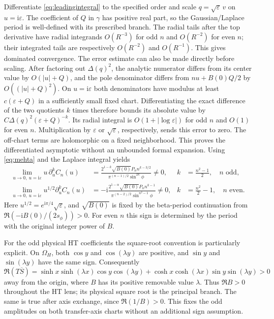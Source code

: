 \documentclass[11pt]{article}
\numberwithin{equation}{section}
\theoremstyle{definition}
\newcommand{\ii}{\mathrm i}
\newcommand{\eps}{\varepsilon}
\newcommand{\OH}{\Omega_H}
\begin{document}
Differentiate \eqref{eq:leadingintegral} to the specified order and
scale $q=\sqrt\eps\,v$ on $u=\ii\eps$. The coefficient of $Q$ in
$\gamma$ has positive real part, so the Gaussian/Laplace period is
well-defined with its prescribed branch. The radial tails after the
top derivative have radial integrands $O(R^{-3})$ for odd $n$ and
$O(R^{-2})$ for even $n$; their integrated tails are respectively
$O(R^{-2})$ and $O(R^{-1})$. This gives dominated convergence.
The error estimate can also be made directly before scaling.
After factoring out $\Delta(q)^2$, the analytic numerator differs
from its center value by $O(|u|+Q)$, and the pole denominator differs
from $nu+B(0)Q/2$ by $O((|u|+Q)^2)$. On $u=\ii\eps$ both
denominators have modulus at least $c(\eps+Q)$ in a sufficiently
small fixed chart. Differentiating the exact difference of the two
quotients $k$ times therefore bounds its absolute value by
$C\Delta(q)^2(\eps+Q)^{-k}$. Its radial integral is
$O(1+|\log\eps|)$ for odd $n$ and $O(1)$ for even $n$.
Multiplication by $\eps$ or $\sqrt\eps$, respectively, sends this
error to zero. The off-chart terms are holomorphic on a fixed
neighborhood. This proves the differentiated asymptotic without
an unbounded formal expansion.
Using \eqref{eq:mehta} and the Laplace integral yields
\begin{align}
 \lim_{u\to0,\ u=\ii\eps}u\,\partial_u^kC_n(u)
 &=\frac{2^{1-k}\sqrt{B(0)}P_n n^{k-3/2}}
        {\pi^{(n-1)/2}\sin^{2k}\phi}\ne0,
 &k&=\frac{n^2-1}{2},\quad n\text{ odd},\label{eq:oddfirst}\\
 \lim_{u\to0,\ u=\ii\eps}u^{1/2}\partial_u^kC_n(u)
 &=-\ii\frac{2^{1-\alpha}\sqrt{B(0)}P_n n^{k-1}}
        {\pi^{(n-2)/2}\sin^{n^2-1}\phi}\ne0,
 &k&=\frac{n^2}{2}-1,\quad n\text{ even}.\label{eq:evenfirst}
\end{align}
Here $u^{1/2}=e^{\ii\pi/4}\sqrt\eps$, and $\sqrt{B(0)}$ is fixed
by the beta-period continuation from
$\Re(-\ii B(0)/(2s_\phi))>0$. For even $n$ this sign is determined
by the period with the original integer power of $B$.

For the odd physical HT coefficients the square-root convention is
particularly explicit. On $\OH$, both $\cos y$ and $\cos(\lambda y)$
are positive, and $\sin y$ and $\sin(\lambda y)$ have the same sign.
Consequently
\[
 \Re(T\overline S)=\sinh x\sinh(\lambda x)\cos y\cos(\lambda y)
 +\cosh x\cosh(\lambda x)\sin y\sin(\lambda y)>0
\]
away from the origin, where $B$ has its positive removable value
$\lambda$. Thus $\Re B>0$ throughout the HT lens; its physical square
root is the principal branch. The same is true after axis exchange,
since $\Re(1/B)>0$. This fixes the odd amplitudes on both transfer-axis
charts without an additional sign assumption.
\end{document}
